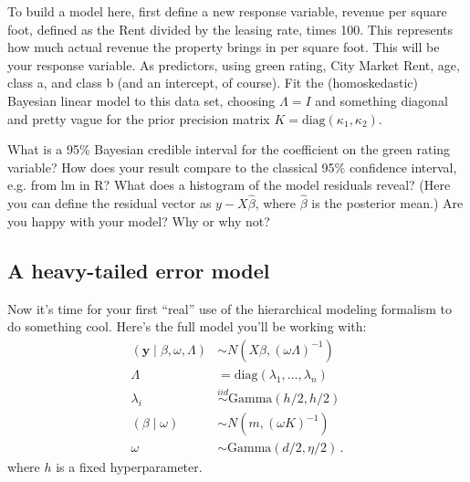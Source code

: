 \documentclass[11pt]{article}
\newcommand{\by}{\textbf{y}}
\begin{document}
To build a model here, first define a new response variable, revenue per square foot, defined as the Rent divided by the leasing rate, times 100.  This represents how much actual revenue the property brings in per square foot.  This will be your response variable.  As predictors, using green rating, City Market Rent, age, class a, and class b (and an intercept, of course).  Fit the (homoskedastic) Bayesian linear model to this data set, choosing $\Lambda = I$ and something diagonal and pretty vague for the prior precision matrix $K = \mbox{diag}(\kappa_1, \kappa_2)$.

What is a 95\% Bayesian credible interval for the coefficient on the green rating variable?  How does your result compare to the classical 95\% confidence interval, e.g. from lm in R?  What does a histogram of the model residuals reveal?  (Here you can define the residual vector as $y - X \hat{\beta}$, where $\hat{\beta}$ is the posterior mean.)  Are you happy with your model?  Why or why not?  




\subsection{A heavy-tailed error model}


Now it's time for your first ``real'' use of the hierarchical modeling formalism to do something cool.  Here's the full model you'll be working with:
\begin{align}
(\by \mid \beta, \omega, \Lambda) &\sim N(X \beta, (\omega \Lambda)^{-1}) \\
\Lambda &= \mbox{diag}(\lambda_1, \ldots, \lambda_n) \\
\lambda_i &\stackrel{iid}{\sim} \mbox{Gamma}(h/2, h/2) \\
(\beta \mid \omega) &\sim N(m, (\omega K)^{-1}) \\
\omega &\sim \mbox{Gamma}(d/2, \eta/2) \, .
\end{align}
where $h$ is a fixed hyperparameter.
\end{document}
